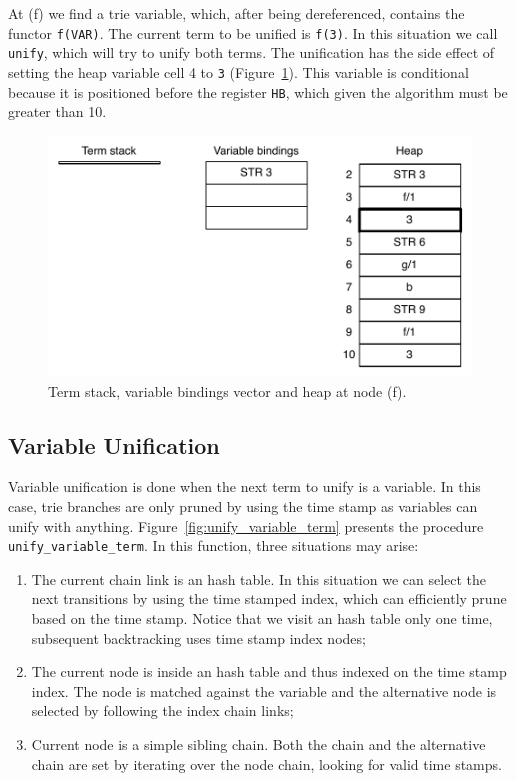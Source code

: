 At (f) we find a trie variable, which, after being dereferenced, contains the
functor \texttt{f(VAR)}. The current term to be unified is \texttt{f(3)}.
In this situation we call \texttt{unify}, which will try to unify both terms.
The unification has the side effect of setting the heap variable cell 4 to \texttt{3}
(Figure~\ref{fig:collect_functor5}).
This variable is conditional because it is positioned before the register \texttt{HB},
which given the algorithm must be greater than 10.

\begin{figure}[H]
  \centering
    \includegraphics[scale=0.5]{collect_functor5.pdf}
  \caption{Term stack, variable bindings vector and heap at node (f).}
  \label{fig:collect_functor5}
\end{figure}

\subsection{Variable Unification}

\begin{samepage}
Variable unification is done when the next term to unify is a variable. In this case, trie branches are only pruned
by using the time stamp as variables can unify with anything.
Figure~\ref{fig:unify_variable_term} presents the procedure \texttt{unify\_variable\_term}. In this function, three
situations may arise:

\begin{enumerate}
  \item The current chain link is an hash table. In this situation we can select the next transitions
   by using the time stamped index, which can efficiently prune based on the time stamp. Notice that we visit
   an hash table only one time, subsequent backtracking uses time stamp index nodes;
  \item The current node is inside an hash table and thus indexed on the time stamp index.
   The node is matched against the variable and the alternative node is selected by following the index chain links;
  \item Current node is a simple sibling chain. Both the chain and the alternative chain are set by
   iterating over the node chain, looking for valid time stamps.
\end{enumerate}
\end{samepage}

